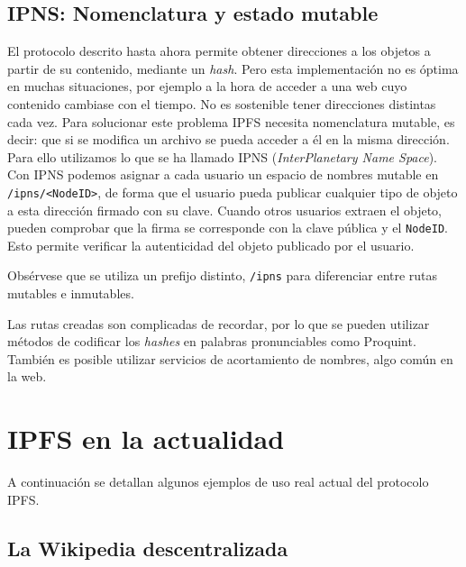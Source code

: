 \documentclass[12pt]{article} %
\begin{document}


\subsection{IPNS: Nomenclatura y estado mutable} %
\label{sub:ipns_denominación_y_estado_mutable}

El protocolo descrito hasta ahora permite obtener direcciones a los objetos a partir de su contenido, mediante un \textit{hash}. Pero esta implementación no es óptima en muchas situaciones, por ejemplo a la hora de acceder a una web cuyo contenido cambiase con el tiempo. No es sostenible tener direcciones distintas cada vez. Para solucionar este problema IPFS necesita nomenclatura mutable, es decir: que si se modifica un archivo se pueda acceder a él en la misma dirección. Para ello utilizamos lo que se ha llamado IPNS (\textit{InterPlanetary Name Space}). Con IPNS podemos asignar a cada usuario un espacio de nombres mutable en \texttt{/ipns/<NodeID>}, de forma que el usuario pueda publicar cualquier tipo de objeto a esta dirección firmado con su clave. Cuando otros usuarios extraen el objeto, pueden comprobar que la firma se corresponde con la clave pública y el \texttt{NodeID}. Esto permite verificar la autenticidad del objeto publicado por el usuario.

Obsérvese que se utiliza un prefijo distinto, \texttt{/ipns} para diferenciar entre rutas mutables e inmutables. 

Las rutas creadas son complicadas de recordar, por lo que se pueden utilizar métodos de codificar los \textit{hashes} en palabras pronunciables como Proquint\cite{proquint}. También es posible utilizar servicios de acortamiento de nombres, algo común en la web.



\section{IPFS en la actualidad} %
\label{sec:la_web_distribuida_en_la_actualidad}

A continuación se detallan algunos ejemplos de uso real actual del protocolo IPFS. 

\subsection{La Wikipedia descentralizada} %
\label{sub:la_wikipedia_descentralizada}
\end{document}

